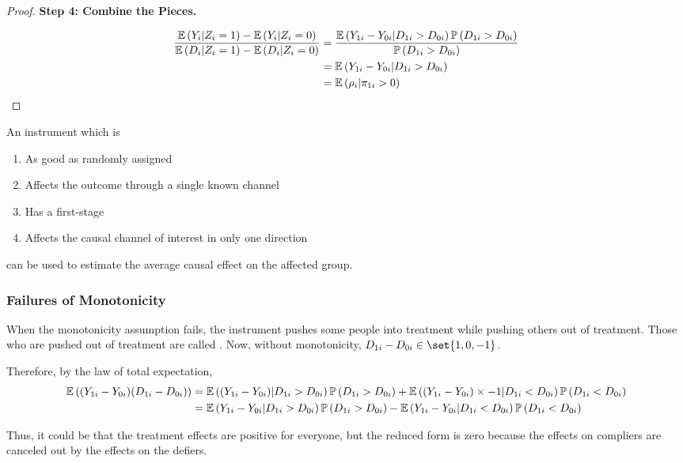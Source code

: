 \documentclass[11pt]{article}
\begin{document}
\begin{proof}
\textbf{Step 4: Combine the Pieces.}

\begin{align*}
	\frac{\mathop{{}\mathbb{E}}\left( Y_i | Z_i = 1 \right) - \mathop{{}\mathbb{E}}\left( Y_i | Z_i = 0 \right)}{\mathop{{}\mathbb{E}}\left( D_i | Z_i = 1 \right) - \mathop{{}\mathbb{E}}\left( D_i | Z_i = 0 \right)} &=  \frac{\mathop{{}\mathbb{E}}\left( Y_{1i} - Y_{0i} | D_{1i} > D_{0i} \right) \mathop{{}\mathbb{P}}\left( D_{1i} > D_{0i} \right)}{\mathop{{}\mathbb{P}}\left( D_{1i} > D_{0i} \right)}\\
	&=\mathop{{}\mathbb{E}}\left( Y_{1i} - Y_{0i} | D_{1i} > D_{0i} \right) \\
	&= \mathop{{}\mathbb{E}}\left( \rho_i | \pi_{1i} > 0 \right)
\end{align*}

\end{proof}

\begin{interpretation}
	An instrument which is
	\begin{enumerate}
		\item As good as randomly assigned
		\item Affects the outcome through a single known channel
		\item Has a first-stage
		\item Affects the causal channel of interest in only one direction
	\end{enumerate}
	can be used to estimate the average causal effect on the affected group. 
\end{interpretation}


\subsubsection{Failures of Monotonicity}

When the monotonicity assumption fails, the instrument pushes some people into treatment while pushing others out of treatment. Those who are pushed out of treatment are called . Now, without monotonicity, $D_{1i} - D_{0i} \in \set{1,0,-1}$. 

Therefore, by the law of total expectation,
\begin{align*}
	\mathop{{}\mathbb{E}}\left( (Y_{1i} - Y_{0i})(D_{1i} - D_{0i}) \right) &=  \mathop{{}\mathbb{E}}\left( (Y_{1i} - Y_{0i}) | D_{1i} > D_{0i} \right) \mathop{{}\mathbb{P}}\left( D_{1i} > D_{0i} \right) +\mathop{{}\mathbb{E}}\left( (Y_{1i} - Y_{0i}) \times -1 | D_{1i} < D_{0i} \right) \mathop{{}\mathbb{P}}\left( D_{1i} < D_{0i} \right) \\
	&= \mathop{{}\mathbb{E}}\left( Y_{1i} - Y_{0i}| D_{1i} > D_{0i} \right) \mathop{{}\mathbb{P}}\left( D_{1i} > D_{0i} \right) - \mathop{{}\mathbb{E}}\left( Y_{1i} - Y_{0i} | D_{1i} < D_{0i} \right) \mathop{{}\mathbb{P}}\left( D_{1i} < D_{0i} \right)
\end{align*}

Thus, it could be that the treatment effects are positive for everyone, but the reduced form is zero because the effects on compliers are canceled out by the effects on the defiers. 
\end{document}
